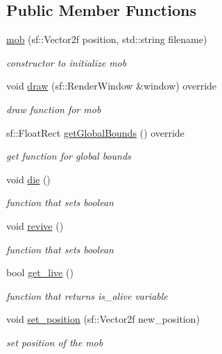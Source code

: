 \subsection*{Public Member Functions}
\begin{DoxyCompactItemize}
\item 
\hyperlink{classmob_ac524dd40986df00721239b66c552437e}{mob} (sf\+::\+Vector2f position, std\+::string filename)
\begin{DoxyCompactList}\small\item\em constructor to initialize mob \end{DoxyCompactList}\item 
void \hyperlink{classmob_a52f5e29b2ac2d87c8c1be7e0ff5ec96b}{draw} (sf\+::\+Render\+Window \&window) override
\begin{DoxyCompactList}\small\item\em draw function for mob \end{DoxyCompactList}\item 
sf\+::\+Float\+Rect \hyperlink{classmob_af3859378fad2a5f93a1c4d833ff74d5d}{get\+Global\+Bounds} () override
\begin{DoxyCompactList}\small\item\em get function for global bounds \end{DoxyCompactList}\item 
void \hyperlink{classmob_ae892b3ce84f4aa16411b385abb5410c8}{die} ()
\begin{DoxyCompactList}\small\item\em function that sets boolean \end{DoxyCompactList}\item 
void \hyperlink{classmob_a3bce6c06653881f8be86fbc60a2b67cb}{revive} ()
\begin{DoxyCompactList}\small\item\em function that sets boolean \end{DoxyCompactList}\item 
bool \hyperlink{classmob_ab327a1798c02be3f9db7c1d01b17ba02}{get\+\_\+live} ()
\begin{DoxyCompactList}\small\item\em function that returns is\+\_\+alive variable \end{DoxyCompactList}\item 
void \hyperlink{classmob_a6556e84e416fd496450d18dd1d0eb1f2}{set\+\_\+position} (sf\+::\+Vector2f new\+\_\+position)
\begin{DoxyCompactList}\small\item\em set position of the mob \end{DoxyCompactList}\end{DoxyCompactItemize}

